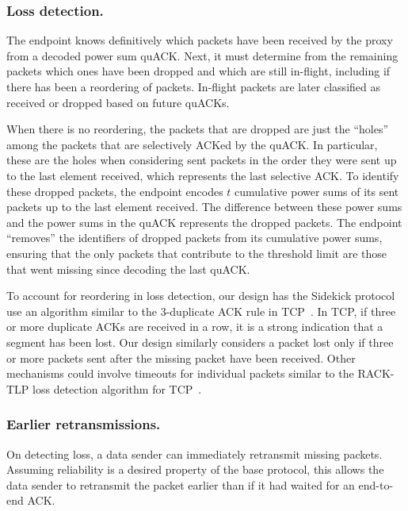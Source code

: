 
\subsubsection{Loss detection.}

The endpoint knows definitively which packets have been received by the proxy from
a decoded power sum quACK. Next, it must determine from the remaining packets which ones
have been dropped and which are still in-flight, including if there has been a
reordering of packets. In-flight packets are later classified as received or
dropped based on future quACKs.

When there is no reordering, the packets that are dropped are just the ``holes''
among the packets that are selectively ACKed by the quACK. In particular, these
are the holes when considering sent packets in the order they were sent up to
the last element received, which represents the last selective ACK. To identify
these dropped packets, the endpoint encodes $t$ cumulative power sums of its sent
packets up to the last element received. The difference between these power
sums and the power sums in the quACK represents the dropped packets. The endpoint
``removes'' the identifiers of dropped packets from its cumulative power sums,
ensuring that the only packets that contribute to the threshold limit are those
that went missing since decoding the last quACK.

To account for reordering in loss detection, our design has the Sidekick
protocol use an
algorithm similar to the 3-duplicate ACK rule in
TCP~\cite{rfc5681tcp,rfc2001tcp}. In TCP, if three or more duplicate ACKs are
received in a row, it is a strong indication that a segment has been lost. Our
design similarly considers a packet lost only if three or more packets sent
after the missing packet have been received. Other mechanisms could involve
timeouts for individual packets similar to the RACK-TLP loss detection
algorithm for TCP~\cite{rfc8985}.

\subsubsection{Earlier retransmissions.}

On detecting loss, a data sender can immediately retransmit missing packets.
Assuming reliability is a desired property of the base protocol, this allows
the data sender to retransmit the packet earlier than if it had waited for an
end-to-end ACK.

